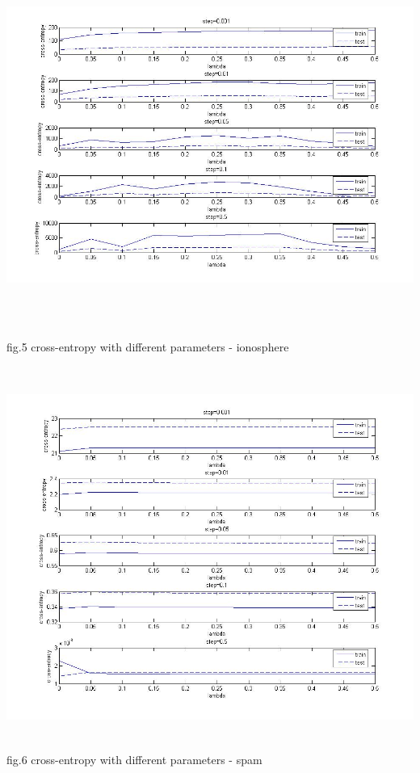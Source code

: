 \documentclass[12pt]{article}
\newenvironment{problem}[2][Problem]{\begin{trivlist}
\item[\hskip \labelsep {\bfseries #1}\hskip \labelsep {\bfseries #2}]}{\end{trivlist}}
\begin{document}
\begin{problem}{3.1 Batch Gradient Descent}
\begin{center}
		\includegraphics[height=12.5cm]{ionosphere_4c.jpg}{\\fig.5 cross-entropy with different parameters - ionosphere}
\end{center}
\begin{center}
		\includegraphics[height=12.5cm]{spams_4c.jpg}{\\fig.6 cross-entropy with different parameters - spam}
\end{center}
\end{problem}
\end{document}
